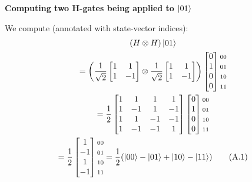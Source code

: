 \documentclass[conference]{IEEEtran}
\begin{document}
\begin{appendices}
\textbf{Computing two H-gates being applied to $\ket{01}$}

We compute (annotated with state-vector indices):
\begin{multline*}
(H \otimes H) \ket{01} \\
=
\left(
\frac{1}{\sqrt{2}}
\begin{bmatrix}
    1 & 1 \\
    1 & -1 \\
\end{bmatrix}
\otimes
\frac{1}{\sqrt{2}}
\begin{bmatrix}
    1 & 1 \\
    1 & -1 \\
\end{bmatrix} \right)
\begin{bmatrix}
    0 \\
    1 \\
    0 \\
    0
\end{bmatrix}
\begin{matrix}
{\scriptstyle 00} \\
{\scriptstyle 01} \\
{\scriptstyle 10} \\
{\scriptstyle 11} \\
\end{matrix} \\
=
\frac{1}{2}
\begin{bmatrix}
    1 & 1 & 1 & 1 \\
    1 & -1 & 1 & -1 \\
    1 & 1 & -1 & -1 \\
    1 & -1 & -1 & 1
\end{bmatrix}
\begin{bmatrix}
    0 \\
    1 \\
    0 \\
    0
\end{bmatrix}
\begin{matrix}
{\scriptstyle 00} \\
{\scriptstyle 01} \\
{\scriptstyle 10} \\
{\scriptstyle 11} \\
\end{matrix} \\
=
\frac{1}{2}
\begin{bmatrix}
    1 \\
    -1 \\
    1 \\
    -1
\end{bmatrix}
\begin{matrix}
{\scriptstyle 00} \\
{\scriptstyle 01} \\
{\scriptstyle 10} \\
{\scriptstyle 11} \\
\end{matrix}
=
\frac{1}{2}(\ket{00} - \ket{01} + \ket{10} - \ket{11})
\tag{A.1}
\label{appendix:eq:twoHGatesDeutsch}
\end{multline*}


\end{appendices}
\end{document}
